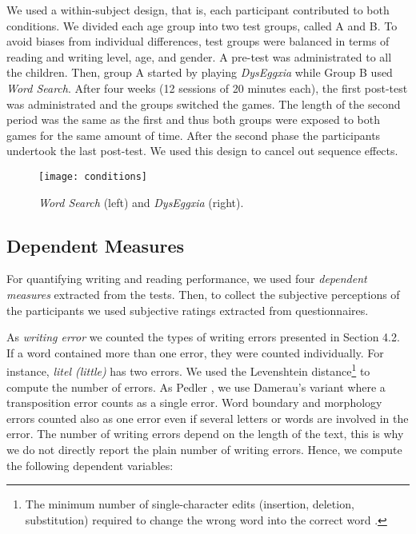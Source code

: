 \documentclass[letterpaper]{sig-alternate-2013}
\begin{document}
We used a within-subject design, that is, each participant contributed to both conditions. We divided each age group into two test groups, called A and B. To avoid biases from individual differences, test groups were balanced in terms of reading and writing level, age, and gender. A pre-test was administrated to all the children. Then, group A started by playing {\it DysEggxia} while Group B used {\it Word Search}. After four weeks (12 sessions of 20 minutes each), the first post-test was administrated and the groups switched the games. The length of the second period was the same as the first and thus both groups were exposed to both games for the same amount of time. After the second phase the participants undertook the last post-test. We used this design to cancel out sequence effects. 





\begin{figure}[tb!]
	\centering
	\texttt{[image: conditions]}
	\vspace{-0.5cm}
	\caption{{\it Word Search} (left) and {\it DysEggxia} (right).}
	\label{sopa}
	\vspace{-0.3cm}
\end{figure}


\subsection{Dependent Measures}
For quantifying writing and reading performance, we used four {\it dependent measures} extracted from the tests. Then, to collect the subjective perceptions of the participants we used subjective ratings extracted from questionnaires.  


As \emph{writing error} we counted the types of writing errors presented in Section 4.2. If a word contained more than one error, they were counted individually. For instance, {\it *litel (little)} has two errors. We used the Levenshtein distance\footnote{The minimum number of single-character edits (insertion, deletion, substitution) required to change the wrong word into the correct word \cite{lev65}.} to compute the number of errors. As Pedler \cite{Pedler2007}, we use Damerau's variant \cite{Damerau1964} where a transposition error counts as a single error. Word boundary and morphology errors counted also as one error even if several letters or words are involved in the error. The number of writing errors depend on the length of the text, this is why we do not directly report the plain number of writing errors. Hence, we compute the following dependent variables:
\end{document}
